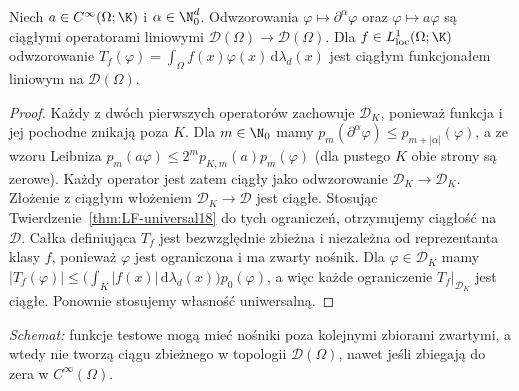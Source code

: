 \begin{stwierdzenie}
\label{prop:D-operators18}
Niech $a\in C^\infty(\Omega;\K)$ i
$\alpha\in\N_0^d$. Odwzorowania
$\varphi\mapsto\partial^\alpha\varphi$ oraz
$\varphi\mapsto a\varphi$ są ciągłymi operatorami
liniowymi $\mathcal D(\Omega)\to\mathcal D(\Omega)$.
Dla $f\in L^1_{\mathrm{loc}}(\Omega;\K)$ odwzorowanie
$T_f(\varphi)=\int_\Omega f(x)\varphi(x)\,\mathrm d\lambda_d(x)$
jest ciągłym funkcjonałem liniowym na $\mathcal D(\Omega)$.
\end{stwierdzenie}
\begin{proof}
Każdy z dwóch pierwszych operatorów zachowuje
$\mathcal D_K$, ponieważ funkcja i jej pochodne znikają
poza $K$. Dla $m\in\N_0$ mamy
$p_m(\partial^\alpha\varphi)\le p_{m+|\alpha|}(\varphi)$,
a ze wzoru Leibniza
$p_m(a\varphi)\le 2^m p_{K,m}(a)p_m(\varphi)$
(dla pustego $K$ obie strony są zerowe).
Każdy operator jest zatem ciągły jako odwzorowanie
$\mathcal D_K\to\mathcal D_K$. Złożenie z ciągłym
włożeniem $\mathcal D_K\to\mathcal D$ jest ciągłe.
Stosując Twierdzenie~\ref{thm:LF-universal18} do tych
ograniczeń, otrzymujemy ciągłość na $\mathcal D$.
Całka definiująca $T_f$ jest bezwzględnie zbieżna
i niezależna od reprezentanta klasy $f$, ponieważ
$\varphi$ jest ograniczona i ma zwarty nośnik.
Dla $\varphi\in\mathcal D_K$ mamy
$|T_f(\varphi)|\le
\bigl(\int_K|f(x)|\,\mathrm d\lambda_d(x)\bigr)p_0(\varphi)$,
a więc każde ograniczenie $T_f|_{\mathcal D_K}$
jest ciągłe. Ponownie stosujemy własność uniwersalną.
\end{proof}

\begin{center}

\small\emph{Schemat:} funkcje testowe mogą mieć nośniki poza
kolejnymi zbiorami zwartymi, a wtedy nie tworzą ciągu zbieżnego
w topologii $\mathcal D(\Omega)$, nawet jeśli zbiegają do zera
w $C^\infty(\Omega)$.
\end{center}

